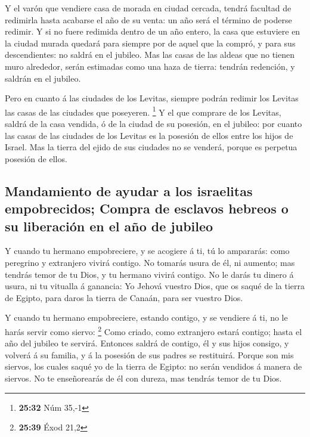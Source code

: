  Y el varón que vendiere casa de morada en ciudad
cercada, tendrá facultad de redimirla hasta acabarse el año de su venta:
un año será el término de poderse redimir.  Y si no fuere
redimida dentro de un año entero, la casa que estuviere en la ciudad
murada quedará para siempre por de aquel que la compró, y para sus
descendientes: no saldrá en el jubileo.  Mas las casas de
las aldeas que no tienen muro alrededor, serán estimadas como una haza
de tierra: tendrán redención, y saldrán en el jubileo.

 Pero en cuanto á las ciudades de los Levitas, siempre
podrán redimir los Levitas las casas de las ciudades que poseyeren.
\footnote{\textbf{25:32} Núm 35,-1}  Y el que comprare de
los Levitas, saldrá de la casa vendida, ó de la ciudad de su posesión,
en el jubileo: por cuanto las casas de las ciudades de los Levitas es la
posesión de ellos entre los hijos de Israel.  Mas la
tierra del ejido de sus ciudades no se venderá, porque es perpetua
posesión de ellos.

\hypertarget{mandamiento-de-ayudar-a-los-israelitas-empobrecidos-compra-de-esclavos-hebreos-o-su-liberaciuxf3n-en-el-auxf1o-de-jubileo}{%
\subsection{Mandamiento de ayudar a los israelitas empobrecidos; Compra
de esclavos hebreos o su liberación en el año de
jubileo}\label{mandamiento-de-ayudar-a-los-israelitas-empobrecidos-compra-de-esclavos-hebreos-o-su-liberaciuxf3n-en-el-auxf1o-de-jubileo}}

 Y cuando tu hermano empobreciere, y se acogiere á ti, tú
lo ampararás: como peregrino y extranjero vivirá contigo.
 No tomarás usura de él, ni aumento; mas tendrás temor de
tu Dios, y tu hermano vivirá contigo.  No le darás tu
dinero á usura, ni tu vitualla á ganancia:  Yo Jehová
vuestro Dios, que os saqué de la tierra de Egipto, para daros la tierra
de Canaán, para ser vuestro Dios.

 Y cuando tu hermano empobreciere, estando contigo, y se
vendiere á ti, no le harás servir como siervo: \footnote{\textbf{25:39}
  Éxod 21,2}  Como criado, como extranjero estará
contigo; hasta el año del jubileo te servirá.  Entonces
saldrá de contigo, él y sus hijos consigo, y volverá á su familia, y á
la posesión de sus padres se restituirá.  Porque son mis
siervos, los cuales saqué yo de la tierra de Egipto: no serán vendidos á
manera de siervos.  No te enseñorearás de él con dureza,
mas tendrás temor de tu Dios.

